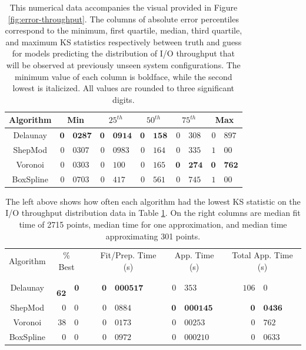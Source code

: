 \documentclass[smallextended,final]{svjour3}  %
\begin{document}
\begin{appendix}
\begin{table}
  \centering
  \begin{tabular}{c|r@{.}l|r@{.}l|r@{.}l|r@{.}l|r@{.}l}
    \hline
    Algorithm & \multicolumn{2}{c|}{Min} & \multicolumn{2}{c|}{$25^{th}$} & \multicolumn{2}{c|}{$50^{th}$} & \multicolumn{2}{c|}{$75^{th}$} & \multicolumn{2}{c}{Max}\\
    \hline
    Delaunay & $\mathbf{0}$&$\mathbf{0287}$ & $\mathbf{0}$&$\mathbf{0914}$ & $\mathbf{0}$&$\mathbf{158}$ & $\mathit{0}$&$\mathit{308}$ & $\mathit{0}$&$\mathit{897}$\\
    ShepMod & $0$&$0307$ & $\mathit{0}$&$\mathit{0983}$ & $\mathit{0}$&$\mathit{164}$ & $0$&$335$ & $1$&$00$\\
    Voronoi & $\mathit{0}$&$\mathit{0303}$ & $0$&$100$ & $0$&$165$ & $\mathbf{0}$&$\mathbf{274}$ & $\mathbf{0}$&$\mathbf{762}$\\
    BoxSpline & $0$&$0703$ & $0$&$417$ & $0$&$561$ & $0$&$745$ & $1$&$00$\\
    \hline
  \end{tabular}
  \caption{This numerical data accompanies the visual provided in
    Figure \ref{fig:error-throughput}. The columns of absolute error
    percentiles correspond to the minimum, first quartile, median,
    third quartile, and maximum KS statistics respectively between
    truth and guess for models predicting the distribution of I/O
    throughput that will be observed at previously unseen system
    configurations. The minimum value of each column is boldface,
    while the second lowest is italicized. All values are rounded to
    three significant digits.}
  \label{table:error-throughput}
\end{table}

\begin{table}
  \centering
  \begin{tabular}{|c|r@{.}l| c |r@{.}l|r@{.}l|r@{.}l|}
    \cline{1-3}\cline{5-10}
    Algorithm & \multicolumn{2}{c|}{\% Best} &  & \multicolumn{2}{c|}{Fit/Prep. Time (s)} & \multicolumn{2}{c|}{App. Time (s)} & \multicolumn{2}{c|}{Total App. Time (s)}\\
    \cline{1-3}\cline{5-10}
    Delaunay & \,\,$\mathbf{62}$&$\mathbf{0}$ &  & \quad\quad$\mathbf{0}$&$\mathbf{000517}$ & \quad$0$&$353$ & \quad\quad\,\,$106$&$0$\\
    ShepMod & $0$&$0$ &  & $0$&$0884$ & $\mathbf{0}$&$\mathbf{000145}$ & $\mathbf{0}$&$\mathbf{0436}$\\
    Voronoi & $\mathit{38}$&$\mathit{0}$ &  & $\mathit{0}$&$\mathit{0173}$ & $0$&$00253$ & $0$&$762$\\
    BoxSpline & $0$&$0$ &  & $0$&$0972$ & $\mathit{0}$&$\mathit{000210}$ & $\mathit{0}$&$\mathit{0633}$\\
    \cline{1-3}\cline{5-10}
  \end{tabular}
  \caption{The left above shows how often each algorithm had the
    lowest KS statistic on the I/O throughput distribution data in
    Table \ref{table:error-throughput}. On the right columns are
    median fit time of 2715 points, median time for one approximation,
    and median time approximating 301 points.}
  \label{table:best-throughput}
\end{table}


\end{appendix}
\end{document}
